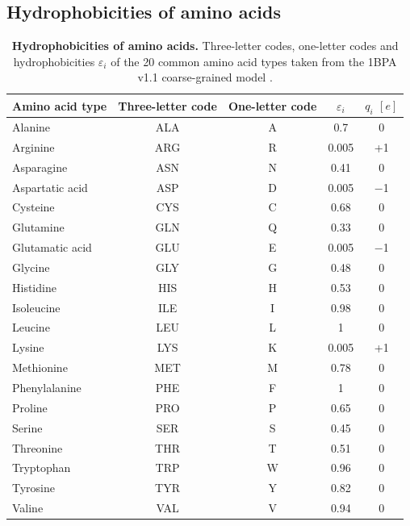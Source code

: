   \subsection{Hydrophobicities of amino acids}
  \begin{table}[h!]
    \renewcommand*{\arraystretch}{1.3}
    \centering
    \caption{\textbf{Hydrophobicities of amino acids. }Three-letter codes, one-letter codes and hydrophobicities $\varepsilon_i$ of the 20 common amino acid types taken from the 1BPA v1.1 coarse-grained model \supercite{Dekker2023}.}
    \label{tab:R2}
    \begin{tabular}{l c c c c}
    \hline\hline
      Amino acid type \;\;\;& Three-letter code & One-letter code & $\varepsilon_i$ & $q_i$ $[e]$ \\
     \hline
        Alanine & ALA & A & 0.7 & 0 \\
        Arginine & ARG & R & 0.005 & +1\;\;\; \\
        Asparagine & ASN & N & 0.41 & 0 \\
        Aspartatic acid & ASP & D & 0.005 & $-$1\;\;\;\\
        Cysteine & CYS & C & 0.68 & 0 \\
        Glutamine & GLN & Q & 0.33 & 0\\
        Glutamatic acid & GLU & E & 0.005 & $-$1\;\;\;\\
        Glycine & GLY & G & 0.48 & 0\\
        Histidine & HIS & H & 0.53 & 0 \\
        Isoleucine & ILE & I & 0.98 & 0 \\
        Leucine & LEU & L & 1 & 0 \\
        Lysine & LYS & K & 0.005 & +1\;\;\; \\
        Methionine & MET & M & 0.78 & 0 \\
        Phenylalanine & PHE & F & 1 & 0 \\
        Proline & PRO & P & 0.65 & 0 \\
        Serine & SER & S & 0.45 & 0 \\
        Threonine & THR & T & 0.51 & 0 \\
        Tryptophan & TRP & W & 0.96 & 0 \\
        Tyrosine & TYR & Y & 0.82 & 0 \\
        Valine & VAL & V & 0.94 & 0\\
     \hline
     \hline
    \end{tabular}
  \end{table}
